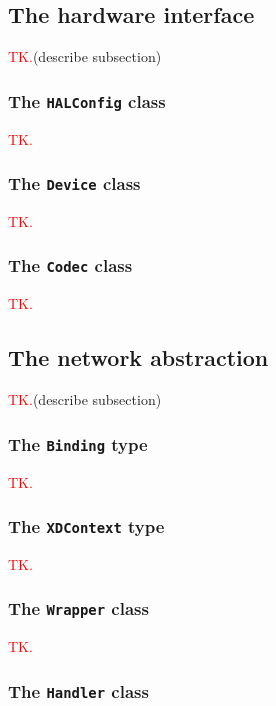 \documentclass[11pt, oneside]{article}
\newcommand{\todo}{\textcolor{red}{TK.}}
\begin{document}
        \subsection{The hardware interface}

            \todo (describe subsection)

            \subsubsection{The \texttt{HALConfig} class}

                \todo

            \subsubsection{The \texttt{Device} class}

                \todo

            \subsubsection{The \texttt{Codec} class} \label{codec}

                \todo

        \subsection{The network abstraction}

            \todo (describe subsection)

            \subsubsection{The \texttt{Binding} type}

                \todo

            \subsubsection{The \texttt{XDContext} type}

                \todo

            \subsubsection{The \texttt{Wrapper} class}

                \todo

            \subsubsection{The \texttt{Handler} class}
\end{document}

